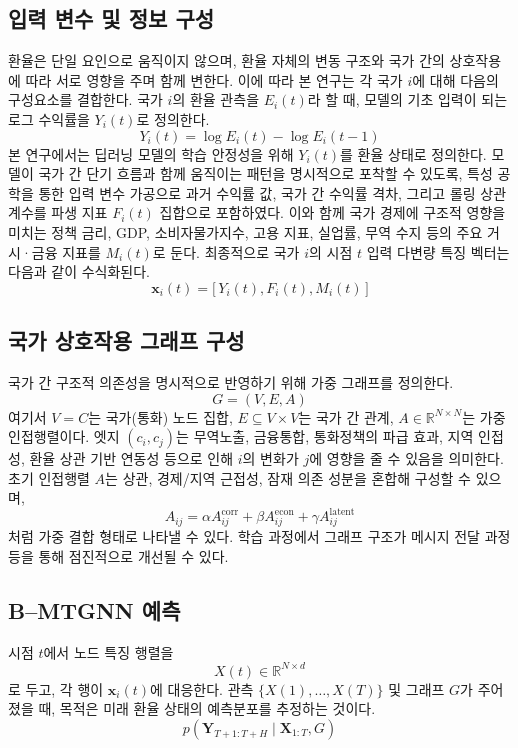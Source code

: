 \subsection{입력 변수 및 정보 구성}
환율은 단일 요인으로 움직이지 않으며, 환율 자체의 변동 구조와 국가 간의 상호작용에 따라 서로 영향을 주며 함께 변한다. 이에 따라 본 연구는 각 국가 $i$에 대해 다음의 구성요소를 결합한다. 국가 $i$의 환율 관측을 $E_i(t)$라 할 때, 모델의 기초 입력이 되는 로그 수익률을 $Y_i(t)$로 정의한다.
\begin{equation}
Y_i(t)=\log E_i(t)-\log E_i(t-1)
\tag{2}
\end{equation}
본 연구에서는 딥러닝 모델의 학습 안정성을 위해 $Y_i(t)$를 환율 상태로 정의한다. 모델이 국가 간 단기 흐름과 함께 움직이는 패턴을 명시적으로 포착할 수 있도록, 특성 공학을 통한 입력 변수 가공으로 과거 수익률 값, 국가 간 수익률 격차, 그리고 롤링 상관계수를 파생 지표 $F_i(t)$ 집합으로 포함하였다. 이와 함께 국가 경제에 구조적 영향을 미치는 정책 금리, GDP, 소비자물가지수, 고용 지표, 실업률, 무역 수지 등의 주요 거시·금융 지표를 $M_i(t)$로 둔다. 최종적으로 국가 $i$의 시점 $t$ 입력 다변량 특징 벡터는 다음과 같이 수식화된다.
\begin{equation}
\mathbf{x}_i(t)=\big[\,Y_i(t),F_i(t),M_i(t)\,\big]
\tag{3}
\end{equation}

\subsection{국가 상호작용 그래프 구성}
국가 간 구조적 의존성을 명시적으로 반영하기 위해 가중 그래프를 정의한다.
\begin{equation}
G=(V,E,A)
\tag{4}
\end{equation}
여기서 $V=C$는 국가(통화) 노드 집합, $E\subseteq V\times V$는 국가 간 관계, $A\in\mathbb{R}^{N\times N}$는 가중 인접행렬이다. 엣지 $(c_i,c_j)$는 무역노출, 금융통합, 통화정책의 파급 효과, 지역 인접성, 환율 상관 기반 연동성 등으로 인해 $i$의 변화가 $j$에 영향을 줄 수 있음을 의미한다.
초기 인접행렬 $A$는 상관, 경제/지역 근접성, 잠재 의존 성분을 혼합해 구성할 수 있으며,
\begin{equation}
A_{ij}=\alpha A^{\mathrm{corr}}_{ij}+\beta A^{\mathrm{econ}}_{ij}+\gamma A^{\mathrm{latent}}_{ij}
\tag{5}
\end{equation}
처럼 가중 결합 형태로 나타낼 수 있다. 학습 과정에서 그래프 구조가 메시지 전달 과정 등을 통해 점진적으로 개선될 수 있다.

\subsection{B--MTGNN 예측}
시점 $t$에서 노드 특징 행렬을
\begin{equation}
X(t)\in\mathbb{R}^{N\times d}
\tag{6}
\end{equation}
로 두고, 각 행이 $\mathbf{x}_i(t)$에 대응한다. 관측 $\{X(1),\dots,X(T)\}$ 및 그래프 $G$가 주어졌을 때, 목적은 미래 환율 상태의 예측분포를 추정하는 것이다. %
\begin{equation}
p\!\left(\mathbf{Y}_{T+1:T+H}\mid \mathbf{X}_{1:T},G\right)
\tag{7}
\end{equation}

